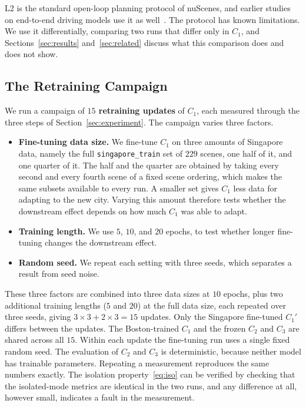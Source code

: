 \documentclass[conference]{IEEEtran}
\begin{document}
L2 is the standard open-loop planning protocol of nuScenes, and earlier studies
on end-to-end driving models use it as well~\cite{hu2023uniad,jiang2023vad,zhai2023rethinking}.
The protocol has known limitations. We use it differentially, comparing two runs
that differ only in $C_1$, and Sections~\ref{sec:results} and~\ref{sec:related}
discuss what this comparison does and does not show.

\subsection{The Retraining Campaign}
\label{sec:campaign}
We run a campaign of \textbf{$15$ retraining updates} of $C_1$, each measured
through the three steps of Section~\ref{sec:experiment}. The campaign varies three factors.
\begin{itemize}
\item \textbf{Fine-tuning data size.} We fine-tune $C_1$ on three amounts of
Singapore data, namely the full \texttt{singapore\_train} set of $229$ scenes,
one half of it, and one quarter of it. The half and the quarter are obtained by
taking every second and every fourth scene of a fixed scene ordering, which makes
the same subsets available to every run. A smaller set gives $C_1$ less data
for adapting to the new city. Varying this amount therefore tests whether the
downstream effect depends on how much $C_1$ was able to adapt.
\item \textbf{Training length.} We use $5$, $10$, and $20$ epochs, to test whether
longer fine-tuning changes the downstream effect.
\item \textbf{Random seed.} We repeat each setting with three seeds, which
separates a result from seed noise.
\end{itemize}
These three factors are combined into three data sizes at $10$ epochs, plus two
additional training lengths ($5$ and $20$) at the full data size, each repeated
over three seeds, giving $3\times3 + 2\times3 = 15$ updates. Only the Singapore fine-tuned $C_1'$ differs between the updates. The
Boston-trained $C_1$ and the frozen $C_2$ and $C_3$ are shared across all $15$.
Within each update the fine-tuning run uses a single fixed random seed. The
evaluation of $C_2$ and $C_3$ is deterministic, because neither model has
trainable parameters. Repeating a
measurement reproduces the same numbers exactly. The isolation
property~\eqref{eq:iso} can be verified by checking that the isolated-mode
metrics are identical in the two runs, and any difference at all, however small,
indicates a fault in the measurement.
\end{document}
